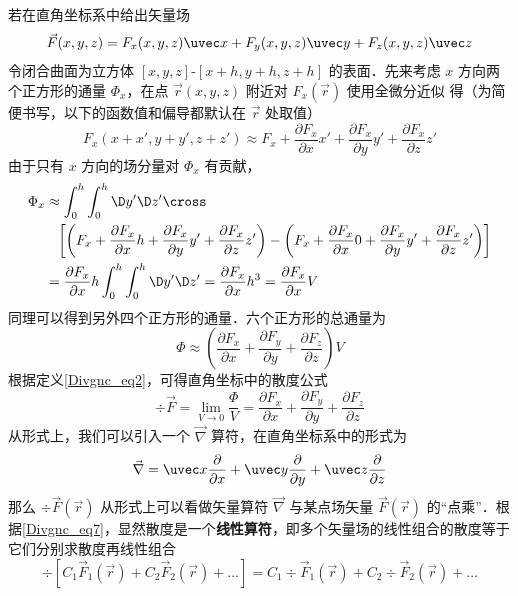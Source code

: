 若在直角坐标系中给出矢量场
\begin{equation}
\vec F(x,y,z) = {F_x}(x,y,z)\uvec x + {F_y}(x,y,z)\uvec y + {F_z}(x,y,z)\uvec z
\end{equation}
令闭合曲面为立方体 $[x,y,z]$-$[x+h,y+h,z+h]$ 的表面．先来考虑 $x$ 方向两个正方形的通量 ${\Phi _x}$，在点 $\vec r (x,y,z)$ 附近对 $F_x(\vec r)$ 使用全微分近似 得（为简便书写，以下的函数值和偏导都默认在 $\vec r$ 处取值）
\begin{equation}
{F_x}(x + x',y + y',z + z') \approx {F_x} + \frac{{\partial {F_x}}}{{\partial x}}x' + \frac{{\partial {F_x}}}{{\partial y}}y' + \frac{{\partial {F_x}}}{{\partial z}}z'
\end{equation}
由于只有 $x$ 方向的场分量对 $\Phi_x$ 有贡献，
\begin{equation}\begin{aligned}
  {\Phi _x} &\approx \int_0^h {\int_0^h {\D y'\D z'} }  \cross \\
  &\phantom{= }\left[ {\left( {{F_x} + \frac{{\partial {F_x}}}{{\partial x}}h + \frac{{\partial {F_x}}}{{\partial y}}y' + \frac{{\partial {F_x}}}{{\partial z}}z'} \right) - \left( {{F_x} + \frac{{\partial {F_x}}}{{\partial x}}0 + \frac{{\partial {F_x}}}{{\partial y}}y' + \frac{{\partial {F_x}}}{{\partial z}}z'} \right)} \right] \\
   &= \frac{{\partial {F_x}}}{{\partial x}}h\int_0^h {\int_0^h {\D y'\D z'} }  = \frac{{\partial {F_x}}}{{\partial x}}{h^3} = \frac{{\partial {F_x}}}{{\partial x}}V
\end{aligned} \end{equation}
同理可以得到另外四个正方形的通量．六个正方形的总通量为
\begin{equation}
\Phi  \approx \left( {\frac{{\partial {F_x}}}{{\partial x}} + \frac{{\partial {F_y}}}{{\partial y}} + \frac{{\partial {F_z}}}{{\partial z}}} \right)V
\end{equation}
根据定义\autoref{Divgnc_eq2}，可得直角坐标中的散度公式
\begin{equation}\label{Divgnc_eq7}
\div \vec F = \mathop {\lim }\limits_{V \to 0} \frac{\Phi }{V} = \frac{{\partial {F_x}}}{{\partial x}} + \frac{{\partial {F_y}}}{{\partial y}} + \frac{{\partial {F_z}}}{{\partial z}}
\end{equation}
从形式上，我们可以引入一个 $\vec\nabla$ 算符，在直角坐标系中的形式为
\begin{equation}
\vec\nabla  = \uvec x\frac{\partial }{{\partial x}} + \uvec y\frac{\partial }{{\partial y}} + \uvec z\frac{\partial }{{\partial z}}
\end{equation}
那么 $\div \vec F(\vec r)$ 从形式上可以看做矢量算符 $\vec\nabla$ 与某点场矢量 $\vec F(\vec r)$ 的“点乘”．根据\autoref{Divgnc_eq7}，显然散度是一个\textbf{线性算符}，即多个矢量场的线性组合的散度等于它们分别求散度再线性组合
\begin{equation}
\div [{C_1}{\vec F_1}(\vec r) + {C_2}{\vec F_2}(\vec r) + ...] = {C_1}\div {\vec F_1}(\vec r) + {C_2}\div {\vec F_2}(\vec r) + \dots
\end{equation}

